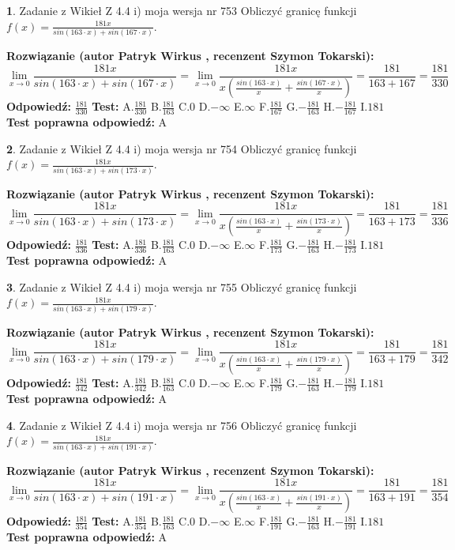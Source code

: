 \documentclass[12pt, a4paper]{article}
\theoremstyle{definition} %
\newtheorem{zad}{}
\newcommand{\zadStart}[1]{\begin{zad}#1\newline}
\newcommand{\zadStop}{\end{zad}}
\newcommand{\rozwStart}[2]{\noindent \textbf{Rozwiązanie (autor #1 , recenzent #2): }\newline}
\newcommand{\rozwStop}{\newline}
\newcommand{\odpStart}{\noindent \textbf{Odpowiedź:}\newline}
\newcommand{\odpStop}{\newline}
\newcommand{\testStart}{\noindent \textbf{Test:}\newline}
\newcommand{\testStop}{\newline}
\newcommand{\kluczStart}{\noindent \textbf{Test poprawna odpowiedź:}\newline}
\newcommand{\kluczStop}{\newline}
\begin{document}
\zadStart{Zadanie z Wikieł Z 4.4 i) moja wersja nr 753}
Obliczyć granicę funkcji $f(x)=\frac{181x}{sin(163\cdot x) +sin(167\cdot x)}$.
\zadStop
\rozwStart{Patryk Wirkus}{Szymon Tokarski}
$$\lim\limits_{x\to 0}\frac{181x}{sin(163\cdot x) +sin(167\cdot x)}=\lim\limits_{x\to 0}\frac{181x}{x(\frac{sin(163\cdot x)}{x}+\frac{sin(167\cdot x)}{x})}=\frac{181}{163+167} = \frac{181}{330}$$
\rozwStop
\odpStart
$\frac{181}{330}$
\odpStop
\testStart
A.$\frac{181}{330}$
B.$\frac{181}{163}$
C.$0$
D.$-\infty$
E.$\infty$
F.$\frac{181}{167}$
G.$-\frac{181}{163}$
H.$-\frac{181}{167}$
I.$181$
\testStop
\kluczStart
A
\kluczStop



\zadStart{Zadanie z Wikieł Z 4.4 i) moja wersja nr 754}
Obliczyć granicę funkcji $f(x)=\frac{181x}{sin(163\cdot x) +sin(173\cdot x)}$.
\zadStop
\rozwStart{Patryk Wirkus}{Szymon Tokarski}
$$\lim\limits_{x\to 0}\frac{181x}{sin(163\cdot x) +sin(173\cdot x)}=\lim\limits_{x\to 0}\frac{181x}{x(\frac{sin(163\cdot x)}{x}+\frac{sin(173\cdot x)}{x})}=\frac{181}{163+173} = \frac{181}{336}$$
\rozwStop
\odpStart
$\frac{181}{336}$
\odpStop
\testStart
A.$\frac{181}{336}$
B.$\frac{181}{163}$
C.$0$
D.$-\infty$
E.$\infty$
F.$\frac{181}{173}$
G.$-\frac{181}{163}$
H.$-\frac{181}{173}$
I.$181$
\testStop
\kluczStart
A
\kluczStop



\zadStart{Zadanie z Wikieł Z 4.4 i) moja wersja nr 755}
Obliczyć granicę funkcji $f(x)=\frac{181x}{sin(163\cdot x) +sin(179\cdot x)}$.
\zadStop
\rozwStart{Patryk Wirkus}{Szymon Tokarski}
$$\lim\limits_{x\to 0}\frac{181x}{sin(163\cdot x) +sin(179\cdot x)}=\lim\limits_{x\to 0}\frac{181x}{x(\frac{sin(163\cdot x)}{x}+\frac{sin(179\cdot x)}{x})}=\frac{181}{163+179} = \frac{181}{342}$$
\rozwStop
\odpStart
$\frac{181}{342}$
\odpStop
\testStart
A.$\frac{181}{342}$
B.$\frac{181}{163}$
C.$0$
D.$-\infty$
E.$\infty$
F.$\frac{181}{179}$
G.$-\frac{181}{163}$
H.$-\frac{181}{179}$
I.$181$
\testStop
\kluczStart
A
\kluczStop



\zadStart{Zadanie z Wikieł Z 4.4 i) moja wersja nr 756}
Obliczyć granicę funkcji $f(x)=\frac{181x}{sin(163\cdot x) +sin(191\cdot x)}$.
\zadStop
\rozwStart{Patryk Wirkus}{Szymon Tokarski}
$$\lim\limits_{x\to 0}\frac{181x}{sin(163\cdot x) +sin(191\cdot x)}=\lim\limits_{x\to 0}\frac{181x}{x(\frac{sin(163\cdot x)}{x}+\frac{sin(191\cdot x)}{x})}=\frac{181}{163+191} = \frac{181}{354}$$
\rozwStop
\odpStart
$\frac{181}{354}$
\odpStop
\testStart
A.$\frac{181}{354}$
B.$\frac{181}{163}$
C.$0$
D.$-\infty$
E.$\infty$
F.$\frac{181}{191}$
G.$-\frac{181}{163}$
H.$-\frac{181}{191}$
I.$181$
\testStop
\kluczStart
A
\kluczStop
\end{document}

